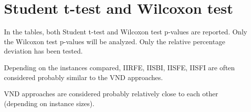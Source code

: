 \newpage\cleardoublepage{}
\section{Student t-test and Wilcoxon test}

In the tables, both Student t-test and Wilcoxon test p-values are reported. Only the Wilcoxon test p-values will be analyzed. Only the relative percentage deviation has been tested.

Depending on the instances compared, IIRFE, IISBI, IISFE, IISFI are often considered probably similar to the VND approaches.

VND approaches are considered probably relatively close to each other (depending on instance sizes).